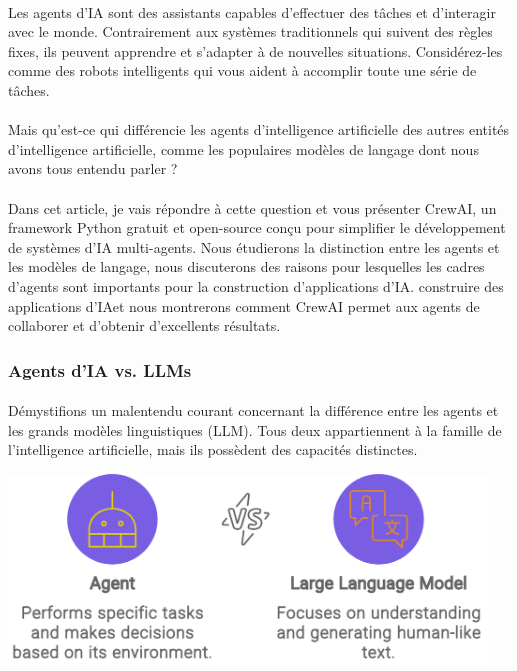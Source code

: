 \paragraph{}
Les agents d'IA sont des assistants capables d'effectuer des tâches et d'interagir avec le monde. Contrairement aux systèmes traditionnels qui suivent des règles fixes, ils peuvent apprendre et s'adapter à de nouvelles situations. Considérez-les comme des robots intelligents qui vous aident à accomplir toute une série de tâches.
\paragraph{}
Mais qu'est-ce qui différencie les agents d'intelligence artificielle des autres entités d'intelligence artificielle, comme les populaires modèles de langage dont nous avons tous entendu parler ?
\paragraph{}
Dans cet article, je vais répondre à cette question et vous présenter CrewAI, un framework Python gratuit et open-source conçu pour simplifier le développement de systèmes d'IA multi-agents. Nous étudierons la distinction entre les agents et les modèles de langage, nous discuterons des raisons pour lesquelles les cadres d'agents sont importants pour la construction d'applications d'IA. construire des applications d'IAet nous montrerons comment CrewAI permet aux agents de collaborer et d'obtenir d'excellents résultats.
\subsubsection{Agents d'IA vs. LLMs }
\paragraph{}
Démystifions un malentendu courant concernant la différence entre les agents et les grands modèles linguistiques (LLM). Tous deux appartiennent à la famille de l'intelligence artificielle, mais ils possèdent des capacités distinctes.

\includegraphics[width=\linewidth, height=5cm]{images/agentVsLLM.png}

